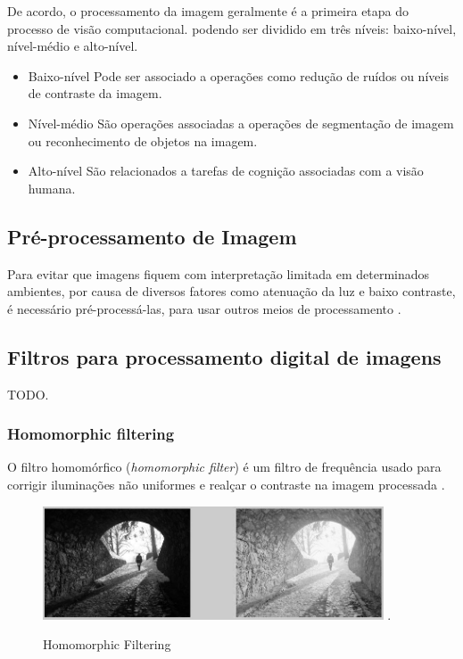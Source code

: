 De acordo, o processamento da imagem geralmente é a primeira etapa do processo de visão computacional.
podendo ser dividido em três níveis: baixo-nível, nível-médio e alto-nível.
\begin{itemize}
\item Baixo-nível
	Pode ser associado a operações como redução de ruídos ou níveis de contraste da imagem.
\item Nível-médio
	São operações associadas a operações de segmentação de imagem ou reconhecimento de objetos na imagem.
\item Alto-nível
	São relacionados a tarefas de cognição associadas com a visão humana.
\end{itemize} 

\subsection{Pré-processamento de Imagem} \label{sect:preprocs}
Para evitar que imagens fiquem com interpretação limitada em determinados ambientes, por causa de diversos fatores como atenuação da luz e baixo contraste, é necessário pré-processá-las, para usar outros meios de processamento \cite{bazeille2006}. 

\subsection{Filtros para processamento digital de imagens}
TODO.

\subsubsection{Homomorphic filtering} 
	O filtro homomórfico (\textit{homomorphic filter}) é um filtro de frequência usado para corrigir iluminações não uniformes e realçar o contraste na imagem processada \cite{bazeille2006}.
     
 \begin{figure}[H]
	\centering
    	\caption{\label{fig:homofilter}Homomorphic Filtering}
		\includegraphics[width = 0.9\textwidth]	{resources/homofilter}
    	.
\end{figure}

